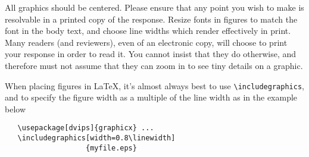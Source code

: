 \documentclass[10pt,twocolumn,letterpaper]{article}
\begin{document}
All graphics should be centered.  Please ensure that any point you wish to make is resolvable in a printed copy of the response.  Resize fonts in figures to match the font in the body text, and choose line widths which render effectively in print.  Many readers (and reviewers), even of an electronic copy, will choose to print your response in order to read it.  You cannot insist that they do otherwise, and therefore must not assume that they can zoom in to see tiny details on a graphic.

When placing figures in \LaTeX, it's almost always best to use \verb+\includegraphics+, and to specify the  figure width as a multiple of the line width as in the example below
{\small\begin{verbatim}
   \usepackage[dvips]{graphicx} ...
   \includegraphics[width=0.8\linewidth]
                   {myfile.eps}
\end{verbatim}
}


{\small


}
\end{document}
